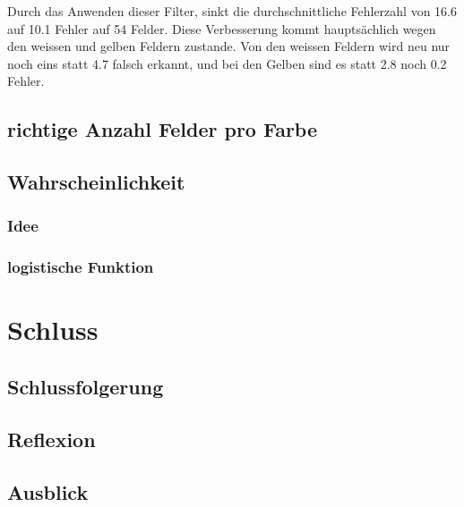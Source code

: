 \documentclass[a4paper, 12pt]{article}
\begin{document}
Durch das Anwenden dieser Filter, sinkt die durchschnittliche Fehlerzahl von 16.6 auf 10.1 Fehler auf 54 Felder. Diese Verbesserung kommt hauptsächlich wegen den weissen und gelben Feldern zustande. Von den weissen Feldern wird neu nur noch eins statt 4.7 falsch erkannt, und bei den Gelben sind es statt 2.8 noch 0.2 Fehler.
\subsection{richtige Anzahl Felder pro Farbe}
\subsection{Wahrscheinlichkeit}
\subsubsection{Idee}
\subsubsection{logistische Funktion}
\section{Schluss}
\subsection{Schlussfolgerung}
\subsection{Reflexion}
\subsection{Ausblick}
\end{document}
